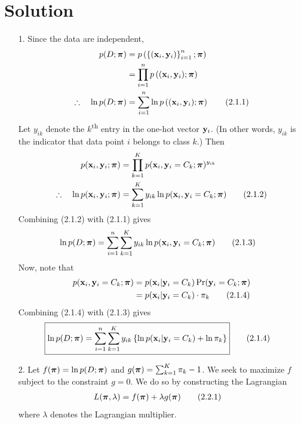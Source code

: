 \documentclass[submit]{../harvardml}
\newenvironment{solution}
  {\color{blue}\section*{Solution}}
{}
\begin{document}
\begin{solution}

\begin{enumerate}
    \item [1.] Since the data are independent,
    \begin{align*}
        p(D; \boldsymbol{\pi}) &= p\left( \left\{ (\mathbf{x}_i, \mathbf{y}_i) \right\}_{i=1}^n ; \boldsymbol{\pi} \right) \\
        &= \prod_{i=1}^n p\left( (\mathbf{x}_i,\mathbf{y}_i) ; \boldsymbol{\pi} \right) \\
        \therefore \quad \ln p(D; \boldsymbol{\pi}) &= \sum_{i=1}^n \ln p\left( (\mathbf{x}_i,\mathbf{y}_i) ; \boldsymbol{\pi} \right)
        \tag*{(2.1.1)}
    \end{align*}
    Let $y_{ik}$ denote the $k$\textsuperscript{th} entry in the one-hot vector $\mathbf{y}_i$. (In other words, $y_{ik}$ is the indicator that data point $i$ belongs to class $k$.) Then
    \begin{align*}
        p(\mathbf{x}_i, \mathbf{y}_i; \boldsymbol{\pi}) &= \prod_{k=1}^K p(\mathbf{x}_i, \mathbf{y}_i = C_k; \boldsymbol{\pi})^{y_{ik}} \\
        \therefore \quad \ln p(\mathbf{x}_i, \mathbf{y}_i; \boldsymbol{\pi}) &= \sum_{k=1}^K y_{ik} \ln p(\mathbf{x}_i, \mathbf{y}_i = C_k; \boldsymbol{\pi}) \tag*{(2.1.2)}
    \end{align*}
    Combining (2.1.2) with (2.1.1) gives
    \begin{align*}
        \ln p(D; \boldsymbol{\pi}) &= \sum_{i=1}^n \sum_{k=1}^K y_{ik} \ln p(\mathbf{x}_i, \mathbf{y}_i = C_k; \boldsymbol{\pi}) \tag*{(2.1.3)}
    \end{align*}
    Now, note that
    \begin{align*}
        p(\mathbf{x}_i, \mathbf{y}_i=C_k; \boldsymbol{\pi}) &= p(\mathbf{x}_i | \mathbf{y}_i = C_k)\Pr(\mathbf{y}_i = C_k; \boldsymbol{\pi}) \\
        &= p(\mathbf{x}_i | \mathbf{y}_i = C_k) \cdot \pi_k \tag*{(2.1.4)}
    \end{align*}
    Combining (2.1.4) with (2.1.3) gives
    \begin{align*}
        \Aboxed{ \ln p(D; \bpi) &= \sum_{i=1}^n \sum_{k=1}^K y_{ik} \left\{ \ln p(\boldx_i | \boldy_i = C_k) + \ln \pi_k \right\} } \tag*{(2.1.4)}
    \end{align*}

    \item[2.] Let $f(\boldsymbol{\pi}) = \ln p(D; \boldsymbol{\pi})$ and $g(\boldsymbol{\pi}) = \sum_{k=1}^K \pi_k - 1$. We seek to maximize $f$ subject to the constraint $g=0$. We do so by constructing the Lagrangian
    \begin{align*}
        L(\boldsymbol{\pi}, \lambda) &= f(\boldsymbol{\pi}) + \lambda g(\boldsymbol{\pi}) \tag*{(2.2.1)}
    \end{align*}
    where $\lambda$ denotes the Lagrangian multiplier.


\end{enumerate}
\end{solution}
\end{document}
